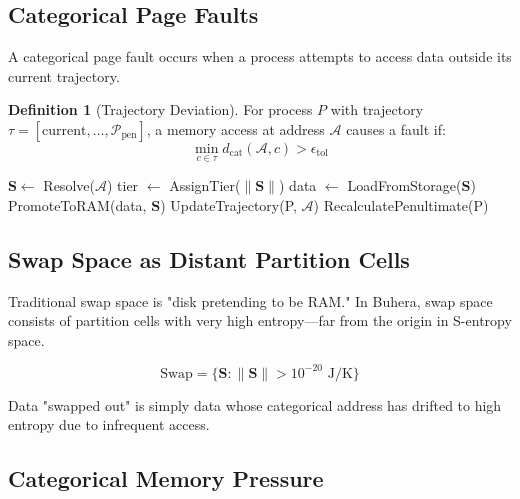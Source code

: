 \documentclass[twocolumn,10pt]{article}
\theoremstyle{definition}
\newtheorem{definition}[theorem]{Definition}
\theoremstyle{remark}
\newcommand{\cataddr}{\mathcal{A}}
\newcommand{\pentstate}{\mathcal{P}_{\text{pen}}}
\newcommand{\Scoord}{\mathbf{S}}
\newcommand{\dcat}{d_{\text{cat}}}
\begin{document}
\subsection{Categorical Page Faults}

A categorical page fault occurs when a process attempts to access data outside its current trajectory.

\begin{definition}[Trajectory Deviation]
For process $P$ with trajectory $\tau = [\text{current}, \ldots, \pentstate]$, a memory access at address $\cataddr$ causes a fault if:
\begin{equation}
    \min_{c \in \tau} \dcat(\cataddr, c) > \epsilon_{\text{tol}}
\end{equation}
\end{definition}

\begin{algorithm}
\caption{Handle Categorical Page Fault}
\begin{algorithmic}[1]
\Function{HandlePageFault}{P, $\cataddr$}
    \State $\Scoord \gets$ Resolve($\cataddr$)
    \State tier $\gets$ AssignTier($\|\Scoord\|$)
        \State data $\gets$ LoadFromStorage($\Scoord$)
        \State PromoteToRAM(data, $\Scoord$)
    \EndIf
    \State UpdateTrajectory(P, $\cataddr$)
    \State RecalculatePenultimate(P)
\EndFunction
\end{algorithmic}
\end{algorithm}

\subsection{Swap Space as Distant Partition Cells}

Traditional swap space is "disk pretending to be RAM." In Buhera, swap space consists of partition cells with very high entropy—far from the origin in S-entropy space.

\begin{equation}
    \text{Swap} = \{\Scoord : \|\Scoord\| > 10^{-20} \text{ J/K}\}
\end{equation}

Data "swapped out" is simply data whose categorical address has drifted to high entropy due to infrequent access.

\subsection{Categorical Memory Pressure}
\end{document}
